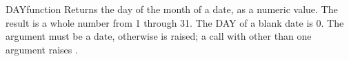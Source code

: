 \begin{XbaseEntry}{DAY}{function}
Returns the day of the month of a date, as a numeric value.
\Syntax
{}
\Usage
The result is a whole number from 1 through 31. The DAY of a blank date is 0. The argument must be a date, otherwise  is raised; a call with other than one argument raises .
\Examples
{}
\end{XbaseEntry}

